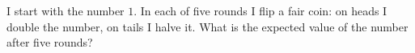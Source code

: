 I start with the number $1$. In each of five rounds I flip a fair coin: on heads I double the number, on tails I halve it. What is the expected value of the number after five rounds?
